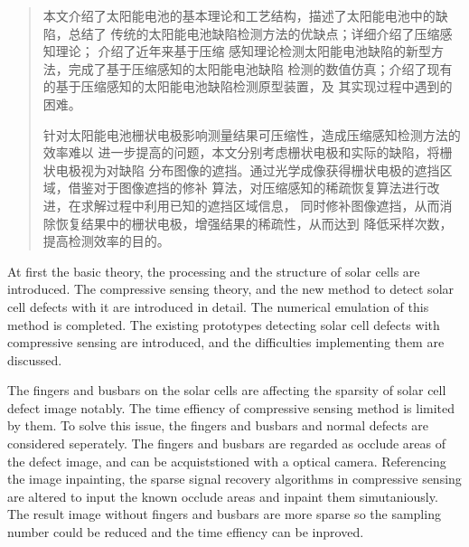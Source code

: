 \begin{abstract}
本文介绍了太阳能电池的基本理论和工艺结构，描述了太阳能电池中的缺陷，总结了
传统的太阳能电池缺陷检测方法的优缺点；详细介绍了压缩感知理论；
介绍了近年来基于压缩
感知理论检测太阳能电池缺陷的新型方法，完成了基于压缩感知的太阳能电池缺陷
检测的数值仿真；介绍了现有的基于压缩感知的太阳能电池缺陷检测原型装置，及
其实现过程中遇到的困难。

针对太阳能电池栅状电极影响测量结果可压缩性，造成压缩感知检测方法的效率难以
进一步提高的问题，本文分别考虑栅状电极和实际的缺陷，将栅状电极视为对缺陷
分布图像的遮挡。通过光学成像获得栅状电极的遮挡区域，借鉴对于图像遮挡的修补
算法，对压缩感知的稀疏恢复算法进行改进，在求解过程中利用已知的遮挡区域信息，
同时修补图像遮挡，从而消除恢复结果中的栅状电极，增强结果的稀疏性，从而达到
降低采样次数，提高检测效率的目的。
\end{abstract}

\begin{enabstract}
At first the basic theory, the processing and the structure of solar cells
are introduced.  The compressive sensing theory, and the new method to
detect solar cell defects with it are introduced in detail.  The numerical
emulation of this method is completed.  The existing prototypes detecting
solar cell defects with compressive sensing are introduced, and the
difficulties implementing them are discussed.

The fingers and busbars on the solar cells are affecting the sparsity of
solar cell defect image notably.  The time effiency of compressive
sensing method is limited by them.  To solve this issue, the fingers and
busbars and normal defects are considered seperately.  The fingers and
busbars are regarded as occlude areas of the defect image, and can be
acquiststioned with a optical camera.  Referencing the image inpainting,
the sparse signal recovery algorithms in compressive sensing are altered
to input the known occlude areas and inpaint them simutaniously.  The
result image without fingers and busbars are more sparse so the sampling
number could be reduced and the time effiency can be inproved.
\end{enabstract}
